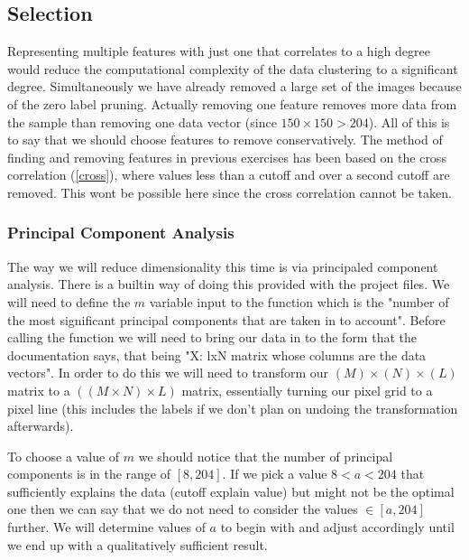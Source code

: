 \documentclass[12pt, a4paper]{article}
\begin{document}
\subsection{Selection}

Representing multiple features with just one that correlates to a high degree would reduce the computational complexity of the data clustering to a significant degree. Simultaneously we have already removed a large set of the images because of the zero label pruning. Actually removing one feature removes more data from the sample than removing one data vector (since $150\times150>204$). All of this is to say that we should choose features to remove conservatively. The method of finding and removing features in previous exercises has been based on the cross correlation (\ref{cross}), where values less than a cutoff and over a second cutoff are removed. This wont be possible here since the cross correlation cannot be taken.
\newline

\subsubsection{Principal Component Analysis}

The way we will reduce dimensionality this time is via principaled component analysis. There is a builtin way of doing this provided with the project files. We will need to define the $m$ variable input to the function which is the "number of the most significant principal components that are taken in to account". Before calling the function we will need to bring our data in to the form that the documentation says, that being "X: lxN matrix whose columns are the data vectors". In order to do this we will need to transform our $(M)\times (N)\times (L)$ matrix to a $((M\times N) \times L)$ matrix, essentially turning our pixel grid to a pixel line (this includes the labels if we don't plan on undoing the transformation afterwards).
\newline

To choose a value of $m$ we should notice that the number of principal components is in the range of $[8,204]$. If we pick a value $8<a<204$ that sufficiently explains the data (cutoff explain value) but might not be the optimal one then we can say that we do not need to consider the values $\in[a,204]$ further. We will determine values of $a$ to begin with and adjust accordingly until we end up with a qualitatively sufficient result.
\newline
\end{document}
